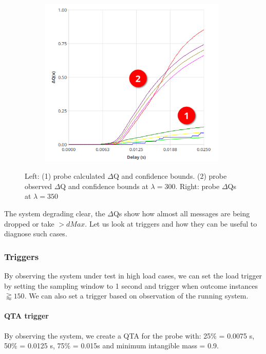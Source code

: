 \begin{figure}[H]
\begin{subfigure}{.5\textwidth}
                \includegraphics[width =0.98\textwidth]{img/overload_2/350_probe2.png}
                \label{fig:high_load_2}
            \end{subfigure}
            \label{fig:early_ov}
            \caption{Left: (1) probe calculated $\Delta$Q and confidence bounds. (2) probe observed $\Delta$Q and confidence bounds at $\lambda = 300$. Right: probe $\Delta$Qs at $\lambda = 350$}
        \end{figure}

    The system degrading clear, the $\Delta$Qs show how almost all messages are being dropped or take $> dMax$. Let us look at triggers and how they can be useful to diagnose such cases.
  
    \subsubsection{Triggers}
        By observing the system under test in high load cases, we can set the load trigger by setting the sampling window to 1 second and trigger when outcome instances $\gtrapprox 150$. We can also set a trigger based on observation of the running system.

        \paragraph{QTA trigger}
            By observing the system, we create a QTA for the probe with: 25\% = 0.0075 s, 50\% = 0.0125 s, 75\% = 0.015s and minimum intangible mass = 0.9.

